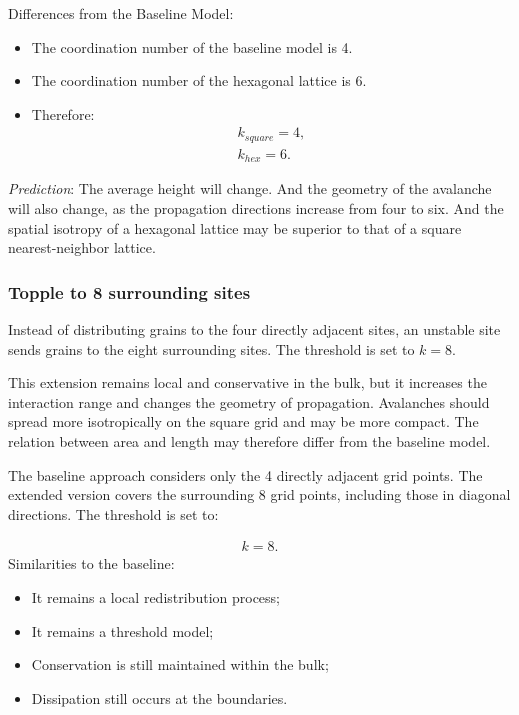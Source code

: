 \documentclass{article}
\begin{document}
Differences from the Baseline Model:
\begin{itemize}
    \item The coordination number of the baseline model is 4.
    \item The coordination number of the hexagonal lattice is 6.
    \item Therefore:
    \begin{align}
        k_{square} = 4,\\
        k_{hex} = 6.
    \end{align}
\end{itemize}

\textit{Prediction}: The average height will change. And the geometry of the avalanche will also change, as the propagation directions increase from four to six. And the spatial isotropy of a hexagonal lattice may be superior to that of a square nearest-neighbor lattice.

\subsubsection{Topple to 8 surrounding sites}
Instead of distributing grains to the four directly adjacent sites, an unstable site sends grains to the eight surrounding sites. The threshold is set to $k=8$.

This extension remains local and conservative in the bulk, but it increases the interaction range and changes the geometry of propagation. Avalanches should spread more isotropically on the square grid and may be more compact. The relation between area and length may therefore differ from the baseline model.

The baseline approach considers only the 4 directly adjacent grid points. The extended version covers the surrounding 8 grid points, including those in diagonal directions. The threshold is set to:

\begin{align}
    k = 8.
\end{align}
Similarities to the baseline:
\begin{itemize}
    \item It remains a local redistribution process;
    \item It remains a threshold model;
    \item Conservation is still maintained within the bulk;
    \item Dissipation still occurs at the boundaries.
\end{itemize}
\end{document}
